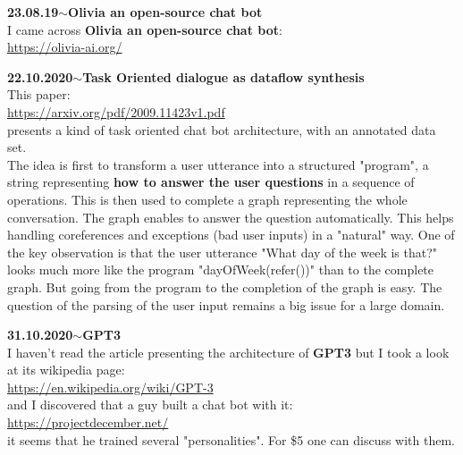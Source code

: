\documentclass[11pt,a4paper]{article}
\newenvironment{loggentry}[2]%
{\noindent\textbf{#1}\hspace{1cm}$\mathbf{\sim}$\text{ }\textbf{#2}\\}{\vspace{0.5cm}}
\begin{document}
\begin{loggentry}{23.08.19}{Olivia an open-source chat bot}

I came across \textbf{Olivia an open-source chat bot}:\\
\url{https://olivia-ai.org/}

\end{loggentry}


\begin{loggentry}{22.10.2020}{Task Oriented dialogue as dataflow synthesis}

This paper:\\
\url{https://arxiv.org/pdf/2009.11423v1.pdf}\\
presents a kind of task oriented chat bot architecture, with an annotated data set.\\
The idea is first to transform a user utterance into a structured "program", a string representing \textbf{how to answer the user questions} in a sequence of operations. This is then used to complete a graph representing the whole conversation. The graph enables to answer the question automatically. This helps handling coreferences and exceptions (bad user inputs) in a "natural" way. One of the key observation is that the user utterance "What day of the week is that?" looks much more like the program "dayOfWeek(refer())" than to the complete graph. But going from the program to the completion of the graph is easy. The question of the parsing of the user input remains a big issue for a large domain.

\end{loggentry}


\begin{loggentry}{31.10.2020}{GPT3}

I haven't read the article presenting the architecture of \textbf{GPT3} but I took a look at its wikipedia page:\\
\url{https://en.wikipedia.org/wiki/GPT-3}\\
and I discovered that a guy built a chat bot with it:\\
\url{https://projectdecember.net/}\\
it seems that he trained several "personalities". For \$5 one can discuss with them.


\end{loggentry}
\end{document}
